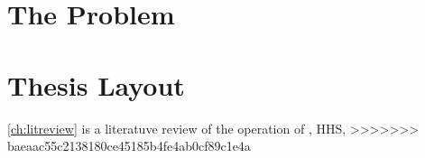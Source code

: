 \section{The Problem} %

\section{Thesis Layout}
\cref{ch:litreview} is a literatuve review of the operation of \HPs, \acs{HHS}, 
>>>>>>> baeaac55c2138180ce45185b4fe4ab0cf89c1e4a
